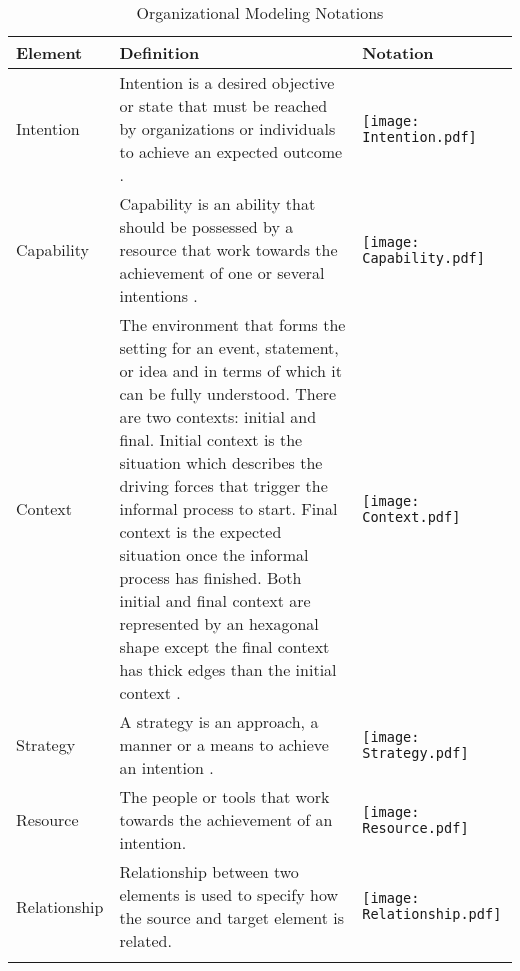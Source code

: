 \begin{center}
	\begin{longtable}{p{3cm}p{10cm}p{3cm}}
		\toprule 
		\textbf{Element} & \textbf{Definition} & \textbf{Notation} \\
		\midrule
		\endfirsthead
		Intention 			& Intention is a desired objective or state that must be reached by organizations or individuals to achieve an expected outcome \cite{DelaVaraGonzalez2007}. & \begin{center} \texttt{[image: Intention.pdf]}  \end{center}  \\
		
		Capability	&  Capability is an ability that should be possessed by a resource that work towards the achievement of one or several intentions \cite{Sierr2015}.   & \begin{center} \texttt{[image: Capability.pdf]} \end{center}  \\
		
		Context				& The environment that forms the setting for an event, statement, or idea and in terms of which it can be fully understood. There are two contexts: initial and final. Initial context is the situation which describes the driving forces that trigger the informal process to start. Final context is the expected situation once the informal process has finished. Both initial and final context are represented by an hexagonal shape except the final context has thick edges than the initial context \cite{Sierr2015}.  & \begin{center} \texttt{[image: Context.pdf]} \end{center}   \\
		\newline
		Strategy		& \newline  A strategy is an approach, a manner or a means to achieve an intention \cite{Bider2005}.   & \begin{center} \texttt{[image: Strategy.pdf]} \end{center}  \\
		
		Resource					& The people or tools that work towards the achievement of an intention. & \begin{center} \texttt{[image: Resource.pdf]} \end{center}  \\
		
		Relationship				& Relationship between two elements is used to specify how the source and target element is related.  & \begin{center} \texttt{[image: Relationship.pdf]} \end{center}   \\
		
		\bottomrule
		\caption{Organizational Modeling Notations}
		\label{tab:notations}		
	\end{longtable}	
\end{center}

